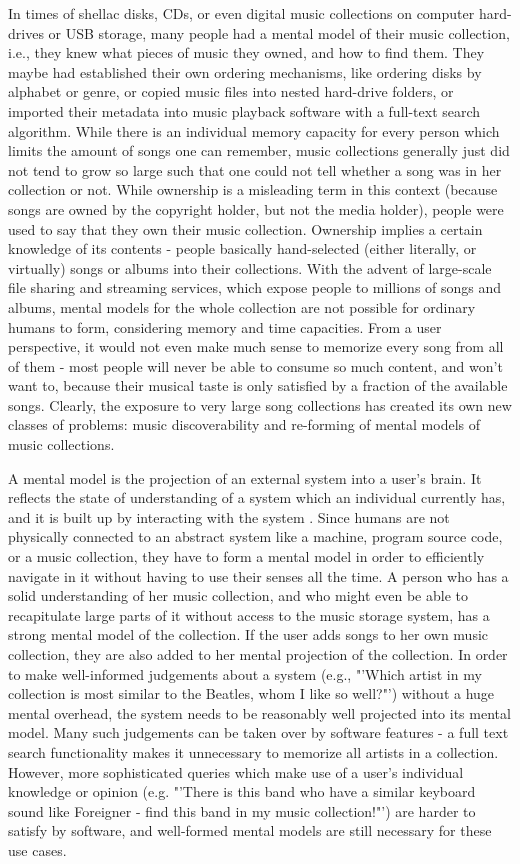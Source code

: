 In times of shellac disks, CDs, or even digital music collections on computer hard-drives or USB storage, many people had a mental model of their music collection, i.e., they knew what pieces of music they owned, and how to find them. They maybe had established their own ordering mechanisms, like ordering disks by alphabet or genre, or copied music files into nested hard-drive folders, or imported their metadata into music playback software with a full-text search algorithm. While there is an individual memory capacity for every person which limits the amount of songs one can remember, music collections generally just did not tend to grow so large such that one could not tell whether a song was in her collection or not. While ownership is a misleading term in this context (because songs are owned by the copyright holder, but not the media holder), people were used to say that they own their music collection. Ownership implies a certain knowledge of its contents - people basically hand-selected (either literally, or virtually) songs or albums into their collections. With the advent of large-scale file sharing and streaming services, which expose people to millions of songs and albums, mental models for the whole collection are not possible for ordinary humans to form, considering memory and time capacities. From a user perspective, it would not even make much sense to memorize every song from all of them - most people will never be able to consume so much content, and won't want to, because their musical taste is only satisfied by a fraction of the available songs. Clearly, the exposure to very large song collections has created its own new classes of problems: music discoverability and re-forming of mental models of music collections.

A mental model is the projection of an external system into a user's brain. It reflects the state of understanding of a system which an individual currently has, and it is built up by interacting with the system \cite{gentner1983mental}. Since humans are not physically connected to an abstract system like a machine, program source code, or a music collection, they have to form a mental model in order to efficiently navigate in it without having to use their senses all the time. A person who has a solid understanding of her music collection, and who might even be able to recapitulate large parts of it without access to the music storage system, has a strong mental model of the collection. If the user adds songs to her own music collection, they are also added to her mental projection of the collection. In order to make well-informed judgements about a system (e.g., "'Which artist in my collection is most similar to the Beatles, whom I like so well?"') without a huge mental overhead, the system needs to be reasonably well projected into its mental model. Many such judgements can be taken over by software features - a full text search functionality makes it unnecessary to memorize all artists in a collection. However, more sophisticated queries which make use of a user's individual knowledge or opinion (e.g. "'There is this band who have a similar keyboard sound like Foreigner - find this band in my music collection!"') are harder to satisfy by software, and well-formed mental models are still necessary for these use cases.

